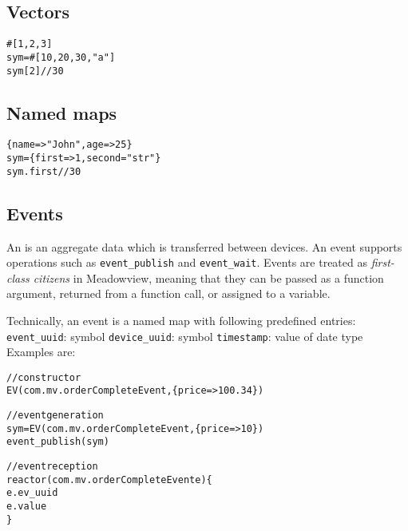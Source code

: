 \documentclass{note}\usepackage{mathptm,mydef}
\begin{document}
\subsection{Vectors}
\begin{alltt}
  \textcolor{red2}{#[1, 2, 3]
  sym = #[10, 20, 30, "a"]
  sym[2]      // 30
}
\end{alltt}

\subsection{Named maps}
\begin{alltt}
  \textcolor{red2}{\{ name => "John", age => 25\}
  sym = \{ first => 1, second = "str" \}
  sym.first     // 30
}
\end{alltt}

\subsection{Events}
An \textcolor{blue2}{} is an aggregate data which is transferred
between devices.  An event supports operations such as 
\textcolor{red2}{\texttt{event\_publish}}
and
\textcolor{red2}{\texttt{event\_wait}}.
Events are treated as {\em first-class citizens\/} in Meadowview, meaning that
they can be passed as a function argument, returned from a function call, or
assigned to a variable.

Technically, an event is a named map with following predefined entries:
\bit
\w \textcolor{red2}{\texttt{event\_uuid}}: symbol
\w \textcolor{red2}{\texttt{device\_uuid}}: symbol
\w \textcolor{red2}{\texttt{timestamp}}: value of date type
\eit
Examples are:
\begin{alltt} 
  \textcolor{red2}{// constructor
  EV(com.mv.orderCompleteEvent, \{price => 100.34\})

  // event generation
  sym = EV(com.mv.orderCompleteEvent, \{price => 10\})
  event\_publish(sym)

  // event reception
  reactor (com.mv.orderCompleteEvent e) \{
    e.ev_uuid
    e.value
  \}
}
\end{alltt}
   


\end{document}
